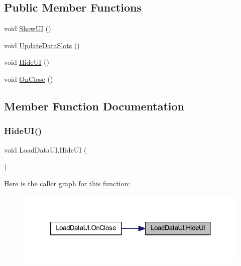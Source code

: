 \subsection*{Public Member Functions}
\begin{DoxyCompactItemize}
\item 
void \mbox{\hyperlink{class_load_data_u_i_ac0ab99a18f93b2092d30e1ecea86154d}{Show\+UI}} ()
\item 
void \mbox{\hyperlink{class_load_data_u_i_a2a36a17c6455a8ca8ee3b92dbbce0503}{Update\+Data\+Slots}} ()
\item 
void \mbox{\hyperlink{class_load_data_u_i_a7909089cf85db5310a5659a7f671b203}{Hide\+UI}} ()
\item 
void \mbox{\hyperlink{class_load_data_u_i_a5d74ebc8dc0756974c13087df72872f0}{On\+Close}} ()
\end{DoxyCompactItemize}


\subsection{Member Function Documentation}
\mbox{\label{class_load_data_u_i_a7909089cf85db5310a5659a7f671b203}} 
\subsubsection{\texorpdfstring{HideUI()}{HideUI()}}
{\footnotesize\ttfamily void Load\+Data\+U\+I.\+Hide\+UI (\begin{DoxyParamCaption}{ }\end{DoxyParamCaption})}

Here is the caller graph for this function\+:\nopagebreak
\begin{figure}[H]
\begin{center}
\leavevmode
\includegraphics[width=321pt]{class_load_data_u_i_a7909089cf85db5310a5659a7f671b203_icgraph}
\end{center}
\end{figure}
\mbox{\label{class_load_data_u_i_a5d74ebc8dc0756974c13087df72872f0}} 
